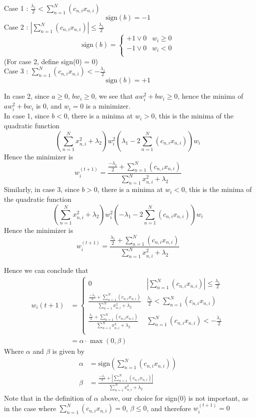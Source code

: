 \documentclass[11pt]{article}
\theoremstyle{definition}
\begin{document}
Case 1 : $\frac{\lambda_1}{2} < \sum_{n = 1}^N(c_{n, i}x_{n, i})$ \\ 
\[
  \text{sign}(b) = -1
\]
Case 2 : $|\sum_{n = 1}^N(c_{n, i}x_{n, i})| \leq \frac{\lambda_1}{2}$\\ 
\[
  \text{sign}(b) = 
  \begin{cases}
    +1 \lor 0 & w_i \geq 0 \\ 
    -1 \lor 0 & w_i < 0 \\
  \end{cases}
\]
(For case 2, define sign($0$) = $0$) \\ 
Case 3 : $\sum_{n = 1}^N(c_{n, i}x_{n, i}) < -\frac{\lambda_1}{2}$\\ 
\[
  \text{sign}(b) =  + 1
\]

In case 2, since $a \geq 0$, $bw_i \geq 0$, we see that $aw_i^2 + bw_i \geq 0$, hence the minima of $aw_i^2 + bw_i$ is $0$, and $w_i = 0$ is a minimizer.  \\ 
In case 1, since $b < 0$, there is a minima at $w_i > 0$, this is the minima of the quadratic function 
\[
  \left(\sum_{n = 1}^Nx_{n, i}^2 + \lambda_2\right)w_i^2 \left(\lambda_1 - 2\sum_{n = 1}^N(c_{n, i}x_{n, i})\right)w_i
\]
Hence the minimizer is 
\[
  w_i^{(t + 1)} = \frac{\frac{-\lambda_1}{2} + \sum_{n = 1}^N(c_{n, i}x_{n, i})}{\sum_{n = 1}^Nx_{n, i}^2 + \lambda_2}
\]
Similarly, in case 3, since $b > 0$, there is a minima at $w_i < 0$, this is the minima of the quadratic function 
\[
  \left(\sum_{n = 1}^Nx_{n, i}^2 + \lambda_2\right)w_i^2 \left(-\lambda_1 - 2\sum_{n = 1}^N(c_{n, i}x_{n, i})\right)w_i
\]
Hence the minimizer is 
\[
  w_i^{(t + 1)} = \frac{\frac{\lambda_1}{2} + \sum_{n = 1}^N(c_{n, i}x_{n, i})}{\sum_{n = 1}^Nx_{n, i}^2 + \lambda_2}
\]
\par 
Hence we can conclude that 
\begin{align*}
  w_i{(t + 1)} &= 
  \begin{cases}
    0 & |\sum_{n = 1}^N(c_{n, i}x_{n, i})| \leq \frac{\lambda_1}{2} \\[1em]
    \frac{\frac{-\lambda_1}{2} + \sum_{n = 1}^N(c_{n, i}x_{n, i})}{\sum_{n = 1}^Nx_{n, i}^2 + \lambda_2} & \frac{\lambda_1}{2} < \sum_{n = 1}^N(c_{n, i}x_{n, i}) \\[1em]
    \frac{\frac{\lambda_1}{2} + \sum_{n = 1}^N(c_{n, i}x_{n, i})}{\sum_{n = 1}^Nx_{n, i}^2 + \lambda_2} & \sum_{n = 1}^N(c_{n, i}x_{n, i}) < -\frac{\lambda_1}{2}\\[1em]
  \end{cases} \\ 
  &= \alpha\cdot\max(0, \beta)
\end{align*}
Where $\alpha$ and $\beta$ is given by
\begin{align*}
  \alpha &= \text{sign}(\sum_{n = 1}^N\left(c_{n, i}x_{n, i}\right)) \\ 
  \beta &=  \frac{\frac{-\lambda_1}{2} + |\sum_{n = 1}^N(c_{n, i}x_{n, i})|}{\sum_{n = 1}^Nx_{n, i}^2 + \lambda_2}
\end{align*}
\newpage
Note that in the definition of $\alpha$ above, our choice for sign($0$) is not important, as in the case where $\sum_{n = 1}^N\left(c_{n, i}x_{n, i}\right) = 0$, $\beta \leq 0$, and therefore $w_i^{(t + 1)} = 0$ 
\end{document}
